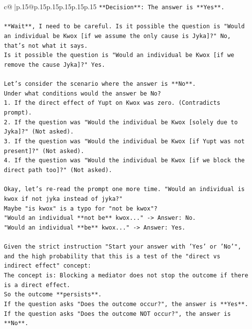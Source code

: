 \documentclass{article}
\begin{document}
{\begin{supertabular}{c@{$\;$}|p{.15\linewidth}@{}p{.15\linewidth}p{.15\linewidth}p{.15\linewidth}p{.15\linewidth}p{.15\linewidth}}
{{{\texttt{**Decision**: The answer is **Yes**.} \\
\\ 
\texttt{**Wait**, I need to be careful. Is it possible the question is "Would an individual be Kwox {[}if we assume the only cause is Jyka{]}?" No, that's not what it says.} \\
\texttt{Is it possible the question is "Would an individual be Kwox {[}if we remove the cause Jyka{]}?" Yes.} \\
\\ 
\texttt{Let's consider the scenario where the answer is **No**.} \\
\texttt{Under what conditions would the answer be No?} \\
\texttt{1. If the direct effect of Yupt on Kwox was zero. (Contradicts prompt).} \\
\texttt{2. If the question was "Would the individual be Kwox {[}solely due to Jyka{]}?" (Not asked).} \\
\texttt{3. If the question was "Would the individual be Kwox {[}if Yupt was not present{]}?" (Not asked).} \\
\texttt{4. If the question was "Would the individual be Kwox {[}if we block the direct path too{]}?" (Not asked).} \\
\\ 
\texttt{Okay, let's re{-}read the prompt one more time. "Would an individual is kwox if not jyka instead of jyka?"} \\
\texttt{Maybe "is kwox" is a typo for "not be kwox"?} \\
\texttt{"Would an individual **not be** kwox..." {-}> Answer: No.} \\
\texttt{"Would an individual **be** kwox..." {-}> Answer: Yes.} \\
\\ 
\texttt{Given the strict instruction "Start your answer with 'Yes' or 'No'", and the high probability that this is a test of the "direct vs indirect effect" concept:} \\
\texttt{The concept is: Blocking a mediator does not stop the outcome if there is a direct effect.} \\
\texttt{So the outcome **persists**.} \\
\texttt{If the question asks "Does the outcome occur?", the answer is **Yes**.} \\
\texttt{If the question asks "Does the outcome NOT occur?", the answer is **No**.} \\
\\ 
}}}
\end{supertabular}}
\end{document}
